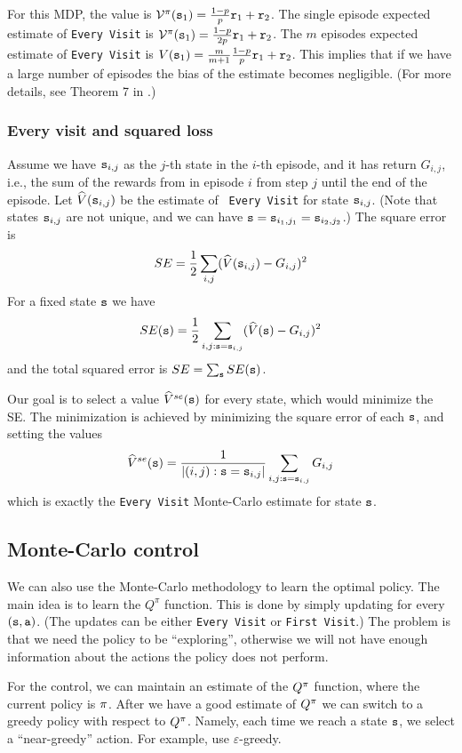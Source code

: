 For this MDP, the value is
$\mathcal{V}^\pi({\tt s}_1)=\frac{1-p}{p}{\tt r}_1+{\tt r}_2$. The single
episode expected estimate of {\tt Every Visit} is
$\mathcal{V}^\pi({\tt s}_1)=\frac{1-p}{2p}{\tt r}_1+{\tt r}_2$. The $m$
episodes expected estimate of {\tt Every Visit} is
$V({\tt s}_1)=\frac{m}{m+1}\frac{1-p}{p}{\tt r}_1+{\tt r}_2$. This
implies that if we have a large number of episodes the bias of the
estimate becomes negligible. (For more details, see Theorem 7 in
\cite{SinghS96}.)

\subsubsection*{Every visit and squared loss}
Assume we have ${\tt s}_{i,j}$ as the $j$-th state
in the $i$-th episode, and it has return $G_{i,j}$, i.e., the sum of
the rewards from in episode $i$ from step $j$ until the end of the
episode. Let $\widehat{V}({\tt s}_{i,j})$ be the estimate of {\tt
Every Visit} for state ${\tt s}_{i,j}$. (Note that states
${\tt s}_{i,j}$ are not unique, and we can have
${\tt s}={\tt s}_{i_1,j_1}={\tt s}_{i_2,j_2}$.) The square error is
\[
SE=\frac{1}{2}\sum_{i,j} (\widehat{V}({\tt s}_{i,j})-G_{i,j})^2
\]
For a fixed state ${\tt s}$ we have
\[
SE({\tt s})=\frac{1}{2}\sum_{i,j:{\tt s}={\tt s}_{i,j}}
(\widehat{V}({\tt s})-G_{i,j})^2
\]
and the total squared error is $SE=\sum_{\tt s} SE({\tt s})$.

Our goal is to select a value $\widehat{V}^{se}({\tt s})$ for every
state, which would minimize the SE. The minimization is achieved by
minimizing the square error of each ${\tt s}$, and setting the values
\[
\widehat{V}^{se}({\tt s})=\frac{1}{|{(i,j):{\tt s}={\tt s}_{i,j}}|}\sum_{i,j:{\tt s}={\tt s}_{i,j}}
G_{i,j}
\]
which is exactly the {\tt Every Visit} Monte-Carlo estimate for
state ${\tt s}$.

\subsection{Monte-Carlo control}

We can also use the Monte-Carlo methodology to learn the optimal
policy.
%
The main idea is to learn the $Q^\pi$ function. This is done by
simply updating for every $({\tt s},{\tt a})$. (The updates can be
either {\tt Every Visit} or {\tt First Visit}.) The problem is that
we need the policy to be ``exploring'', otherwise we will not have
enough information about the actions the policy does not perform.

For the control, we can maintain an estimate of the $Q^\pi$
function, where the current policy is $\pi$. After we have a
good estimate of $Q^\pi$ we can switch to a greedy policy with respect to $Q^\pi$. 
Namely, each time we reach a state ${\tt s}$, 
we select a ``near-greedy'' action. For example, use
$\varepsilon$-greedy.

